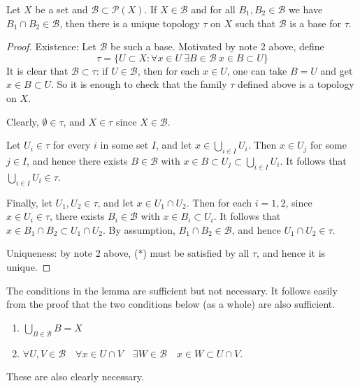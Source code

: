 \documentclass[a4paper,11pt]{article}
\begin{document}
\begin{lemma}\label{lma:4.7}
    Let $X$ be a set and $\mathcal{B} \subset \mathcal{P}(X)$. If $X \in \mathcal{B}$ and for all $B_{1}, B_{2} \in \mathcal{B}$ we have $B_{1} \cap B_{2} \in \mathcal{B}$, then there is a unique topology $\tau$ on $X$ such that $\mathcal{B}$ is a base for $\tau$.
\end{lemma}
\begin{proof}
    Existence: Let $\mathcal{B}$ be such a base. Motivated by note 2 above, define 
    \[
        \tau=\{U \subset X: \forall x \in U\ \exists B \in \mathcal{B}\ x \in B \subset U\} \tag{$*$}
    \]
    It is clear that $\mathcal{B} \subset \tau$: if $U \in \mathcal{B}$, then for each $x \in U$, one can take $B=U$ and get $x \in B \subset U$. So it is enough to check that the family $\tau$ defined above is a topology on $X$.

    Clearly, $\emptyset \in \tau$, and $X \in \tau$ since $X \in \mathcal{B}$.

    Let $U_{i} \in \tau$ for every $i$ in some set $I$, and let $x \in \bigcup_{i \in I} U_{i}$. Then $x \in U_{j}$ for some $j \in I$, and hence there exists $B \in \mathcal{B}$ with $x \in B \subset U_{j} \subset \bigcup_{i \in I} U_{i}$. It follows that $\bigcup_{i \in I} U_{i} \in \tau$. 

    Finally, let $U_{1}, U_{2} \in \tau$, and let $x \in U_{1} \cap U_{2}$. Then for each $i=1,2$, since $x \in U_{i} \in \tau$, there exists $B_{i} \in \mathcal{B}$ with $x \in B_{i} \subset U_{i}$. It follows that $x \in B_{1} \cap B_{2} \subset U_{1} \cap U_{2}$. By assumption, $B_{1} \cap B_{2} \in \mathcal{B}$, and hence $U_{1} \cap U_{2} \in \tau$.

    Uniqueness: by note 2 above, ($*$) must be satisfied by all $\tau$, and hence it is unique. 
\end{proof}

\begin{remark}
    The conditions in the lemma are sufficient but not necessary. It follows easily from the proof that the two conditions below (as a whole) are also sufficient.

\begin{enumerate}
    \item $\bigcup_{B \in \mathcal{B}} B=X$

    \item $\forall U, V \in \mathcal{B} \quad \forall x \in U \cap V \quad \exists W \in \mathcal{B} \quad x \in W \subset U \cap V$.
\end{enumerate}
These are also clearly necessary.
\end{remark}
\end{document}
